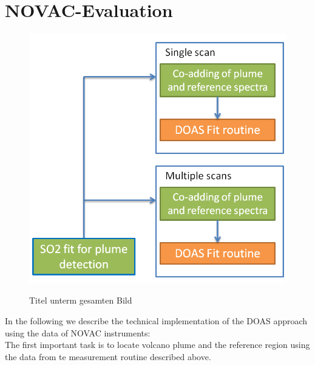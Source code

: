 \documentclass  [
  paper    = a4,
  BCOR     = 10mm,
  twoside,
  fontsize = 12pt,
  fleqn,
  toc      = bibnumbered,
  toc      = listofnumbered,
  numbers  = noendperiod,
  headings = normal,
  listof   = leveldown,
  version  = 3.03
]                                       {scrreprt}
\begin{document}
	\section{NOVAC-Evaluation}
		\begin{figure}[h!]
		\centering
		\includegraphics[width=0.5\linewidth]{Bilder/Simon/Bilder_Tung/Algorithm}
		\caption{}
		\label{fig:algorithm}
	\end{figure}
	\begin{figure}
		\caption{Titel unterm gesamten Bild}
	\end{figure}
	In the following we describe the technical implementation of the DOAS approach using the data of NOVAC instruments:\\
	The first important task is to locate volcano plume and the reference region using the data from te measurement routine described above.
	
\end{document}
